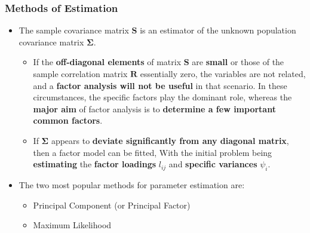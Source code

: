 \documentclass[10pt]{beamer} %
\begin{document}
\begin{frame}
   \frametitle{Methods of Estimation}
   \begin{itemize}
      \item The sample covariance matrix $\mathbf{S}$ is an estimator of the
         unknown population covariance matrix $\mathbf{\Sigma}$. 
         \begin{itemize}
            \item If the \textbf{off-diagonal elements} of matrix $\mathbf{S}$
               are \textbf{small} or those of the sample correlation matrix
               $\mathbf{R}$ essentially zero, the variables are not related, and
               a \textbf{factor analysis will not be useful} in that scenario.
               In these circumstances, the specific factors play the dominant
               role, whereas the \textbf{major aim} of factor analysis is to
               \textbf{determine a few important common factors}.
            \item If $\mathbf{\Sigma}$ appears to \textbf{deviate significantly
               from any diagonal matrix}, then a factor model can be fitted,
               With the initial problem being \textbf{estimating} the
               \textbf{factor loadings} $l_{ij}$ and \textbf{specific variances}
               $\psi_{i}$. 
         \end{itemize}

         \hfill

      \item The two most popular methods for parameter estimation are:
         \begin{itemize}
            \item Principal Component (or Principal Factor)
            \item Maximum Likelihood %
         \end{itemize}
   \end{itemize}    
\end{frame}
\end{document}
